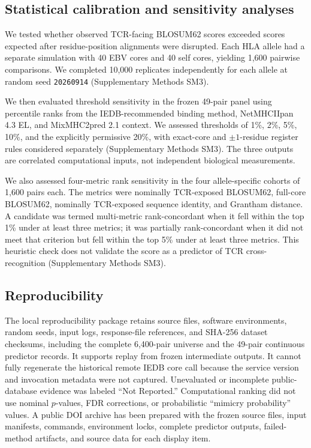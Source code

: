 \documentclass[11pt]{article}
\begin{document}
\subsection{Statistical calibration and sensitivity analyses}
We tested whether observed TCR-facing BLOSUM62 scores exceeded scores expected after residue-position alignments were disrupted. Each HLA allele had a separate simulation with 40 EBV cores and 40 self cores, yielding 1,600 pairwise comparisons. We completed 10,000 replicates independently for each allele at random seed \texttt{20260914} (Supplementary Methods SM3).

We then evaluated threshold sensitivity in the frozen 49-pair panel using percentile ranks from the IEDB-recommended binding method, NetMHCIIpan 4.3 EL, and MixMHC2pred 2.1 context. We assessed thresholds of 1\%, 2\%, 5\%, 10\%, and the explicitly permissive 20\%, with exact-core and $\pm1$-residue register rules considered separately (Supplementary Methods SM3). The three outputs are correlated computational inputs, not independent biological measurements.

We also assessed four-metric rank sensitivity in the four allele-specific cohorts of 1,600 pairs each. The metrics were nominally TCR-exposed BLOSUM62, full-core BLOSUM62, nominally TCR-exposed sequence identity, and Grantham distance. A candidate was termed multi-metric rank-concordant when it fell within the top 1\% under at least three metrics; it was partially rank-concordant when it did not meet that criterion but fell within the top 5\% under at least three metrics. This heuristic check does not validate the score as a predictor of TCR cross-recognition (Supplementary Methods SM3).

\subsection{Reproducibility}
The local reproducibility package retains source files, software environments, random seeds, input logs, response-file references, and SHA-256 dataset checksums, including the complete 6,400-pair universe and the 49-pair continuous predictor records. It supports replay from frozen intermediate outputs. It cannot fully regenerate the historical remote IEDB core call because the service version and invocation metadata were not captured. Unevaluated or incomplete public-database evidence was labeled ``Not Reported.'' Computational ranking did not use nominal $p$-values, FDR corrections, or probabilistic ``mimicry probability'' values. A public DOI archive has been prepared with the frozen source files, input manifests, commands, environment locks, complete predictor outputs, failed-method artifacts, and source data for each display item.
\end{document}
